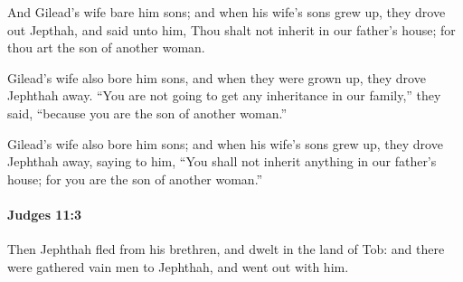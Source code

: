 			\begin{versebox}
					\item[BHS] 
					\item[ASV] And Gilead's wife bare him sons; and when his wife's sons grew up, they drove out Jepthah, and said unto him, Thou shalt not inherit in our father's house; for thou art the son of another woman.
					\item[NIV] Gilead’s wife also bore him sons, and when they were grown up, they drove Jephthah away. “You are not going to get any inheritance in our family,” they said, “because you are the son of another woman.”
					\item[NRSV] Gilead’s wife also bore him sons; and when his wife’s sons grew up, they drove Jephthah away, saying to him, “You shall not inherit anything in our father’s house; for you are the son of another woman.”
			\end{versebox}

		\paragraph{Judges 11:3} %
			\label{JUDGES-11-3}

			Then Jephthah fled from his brethren, and dwelt in the land of Tob: and there were gathered vain men to Jephthah, and went out with him.

